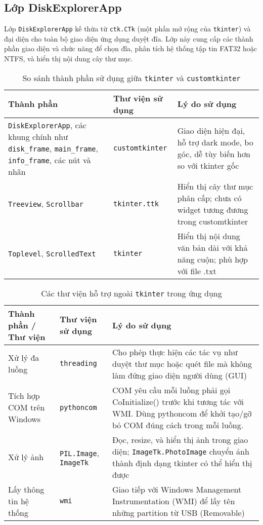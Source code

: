 \subsection{Lớp DiskExplorerApp}

Lớp \texttt{DiskExplorerApp} kế thừa từ \texttt{ctk.CTk} (một phần mở rộng của \texttt{tkinter}) và đại diện cho toàn bộ giao diện ứng dụng duyệt đĩa. Lớp này cung cấp các thành phần giao diện và chức năng để chọn đĩa, phân tích hệ thống tập tin FAT32 hoặc NTFS, và hiển thị nội dung cây thư mục.

\begin{table}[H]
\centering
\begin{tabular}{|p{4cm}|p{3.5cm}|p{6cm}|}
\hline
\textbf{Thành phần} & \textbf{Thư viện sử dụng} & \textbf{Lý do sử dụng} \\
\hline
\texttt{DiskExplorerApp}, các khung chính như \texttt{disk\_frame}, \texttt{main\_frame}, \texttt{info\_frame}, các nút và nhãn & \texttt{customtkinter} & Giao diện hiện đại, hỗ trợ dark mode, bo góc, dễ tùy biến hơn so với tkinter gốc \\
\hline
\texttt{Treeview}, \texttt{Scrollbar} & \texttt{tkinter.ttk} & Hiển thị cây thư mục phân cấp; chưa có widget tương đương trong customtkinter \\
\hline
\texttt{Toplevel}, \texttt{ScrolledText} & \texttt{tkinter} & Hiển thị nội dung văn bản dài với khả năng cuộn; phù hợp với file .txt \\
\hline
\end{tabular}
\caption{So sánh thành phần sử dụng giữa \texttt{tkinter} và \texttt{customtkinter}}
\end{table}

\begin{table}[H]
\centering
\begin{tabular}{|p{4cm}|p{3.5cm}|p{6cm}|}
\hline
\textbf{Thành phần / Thư viện} & \textbf{Thư viện sử dụng} & \textbf{Lý do sử dụng} \\
\hline
Xử lý đa luồng & \texttt{threading} & Cho phép thực hiện các tác vụ như duyệt thư mục hoặc quét file mà không làm đứng giao diện người dùng (GUI) \\
\hline
Tích hợp COM trên Windows & \texttt{pythoncom} & COM yêu cầu mỗi luồng phải gọi CoInitialize() trước khi tương tác với WMI. Dùng pythoncom để khởi tạo/gỡ bỏ COM đúng cách trong mỗi luồng. \\
\hline
Xử lý ảnh & \texttt{PIL.Image}, \texttt{ImageTk} & Đọc, resize, và hiển thị ảnh trong giao diện; \texttt{ImageTk.PhotoImage} chuyển ảnh thành định dạng tkinter có thể hiển thị được \\
\hline
Lấy thông tin hệ thống & \texttt{wmi} & Giao tiếp với Windows Management Instrumentation (WMI) để lấy tên những partition từ USB (Removable) \\
\hline
\end{tabular}
\caption{Các thư viện hỗ trợ ngoài \texttt{tkinter} trong ứng dụng}
\end{table}



